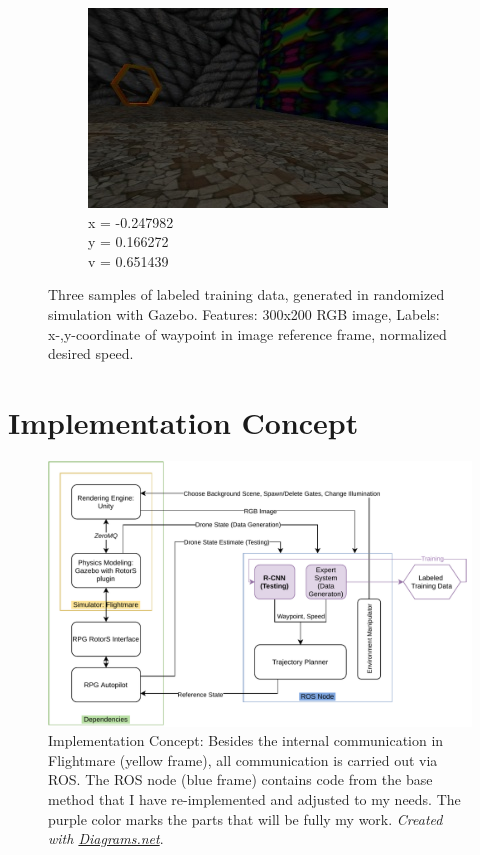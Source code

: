 \begin{figure}[H]
\begin{subfigure}[b]{0.3\textwidth}
		\includegraphics[width=\textwidth]{figures/camera_frame_02499.jpg}
		\caption{x = -0.247982\\y = 0.166272\\v = 0.651439}
		\label{fig:five over x}
	\end{subfigure}
		\caption{Three samples of labeled training data, generated in randomized simulation with Gazebo. 
		Features: 300x200 RGB image, Labels: x-,y-coordinate of waypoint in image reference frame, normalized desired speed.}
		\label{fig:three graphs}
\end{figure}



\section{Implementation Concept}\label{sec:implConcept}


\begin{figure}[H]
    \centering
    \includegraphics[width=1.0\textwidth]{figures/ConceptMasterThesis.drawio.pdf}
    \caption[Implementation Concept]{Implementation Concept: 
	Besides the internal communication in Flightmare (yellow frame),
	all communication is carried out via ROS. 
	The ROS node (blue frame) contains code from the base method that I have re-implemented and adjusted to my needs.
	The purple color marks the parts that will be fully my work. \textit{Created with \href{https://app.diagrams.net/}{Diagrams.net}}.}
    \label{fig:OverviewDiagram}
\end{figure}

